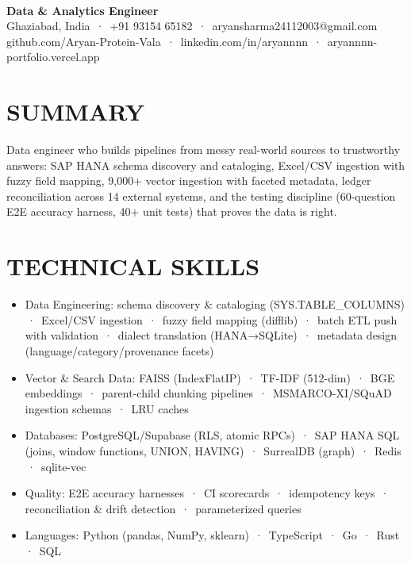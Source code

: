 \documentclass[9pt]{article}
\begin{document}
\\[3pt]
{\large\bfseries Data \& Analytics Engineer}\\[3pt]
{\small\color{greyc} Ghaziabad, India \,·\, +91 93154 65182 \,·\, aryansharma24112003@gmail.com}\vspace{-2pt}
{\small\color{greyc} github.com/Aryan-Protein-Vala \,·\, linkedin.com/in/aryannnn \,·\, aryannnn-portfolio.vercel.app}\vspace{-2pt}
\section*{SUMMARY}
Data engineer who builds pipelines from messy real-world sources to trustworthy answers: SAP HANA schema discovery and cataloging, Excel/CSV ingestion with fuzzy field mapping, 9,000+ vector ingestion with faceted metadata, ledger reconciliation across 14 external systems, and the testing discipline (60-question E2E accuracy harness, 40+ unit tests) that proves the data is right.
\vspace{1pt}
\section*{TECHNICAL SKILLS}
\begin{itemize}[leftmargin=11pt,itemsep=0pt,topsep=1pt,parsep=0pt]
\item Data Engineering: schema discovery \& cataloging (SYS.TABLE\_COLUMNS) \,·\, Excel/CSV ingestion \,·\, fuzzy field mapping (difflib) \,·\, batch ETL push with validation \,·\, dialect translation (HANA→SQLite) \,·\, metadata design (language/category/provenance facets)
\item Vector \& Search Data: FAISS (IndexFlatIP) \,·\, TF-IDF (512-dim) \,·\, BGE embeddings \,·\, parent-child chunking pipelines \,·\, MSMARCO-XI/SQuAD ingestion schemas \,·\, LRU caches
\item Databases: PostgreSQL/Supabase (RLS, atomic RPCs) \,·\, SAP HANA SQL (joins, window functions, UNION, HAVING) \,·\, SurrealDB (graph) \,·\, Redis \,·\, sqlite-vec
\item Quality: E2E accuracy harnesses \,·\, CI scorecards \,·\, idempotency keys \,·\, reconciliation \& drift detection \,·\, parameterized queries
\item Languages: Python (pandas, NumPy, sklearn) \,·\, TypeScript \,·\, Go \,·\, Rust \,·\, SQL
\end{itemize}
\end{document}
